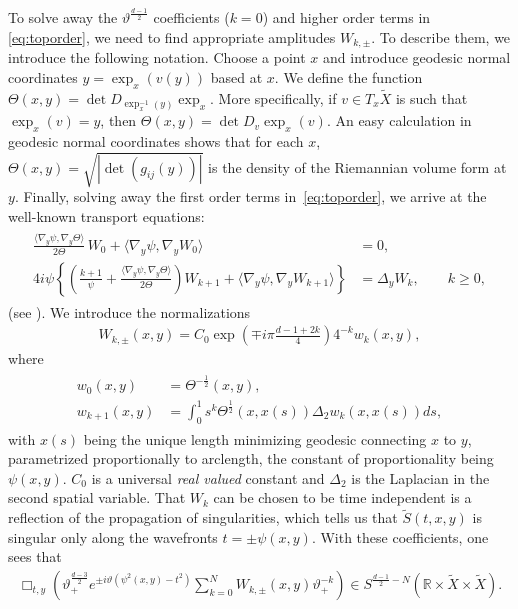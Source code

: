 \documentclass[11pt,letterpaper,oneside]{amsart}
\newcommand{\R}{\mathbb{R}}
\renewcommand{\theta}{\vartheta}
\theoremstyle{definition}
\theoremstyle{remark}
\newcommand{\wt}{\widetilde}
\theoremstyle{definition}
\theoremstyle{remark}
\begin{document}
To solve away the $\theta^{\frac{d-1}{2}}$ coefficients ($k = 0$) and higher order terms in \eqref{eq:toporder}, we need to find appropriate amplitudes $W_{k,\pm}$. To describe them, we introduce the following notation. Choose a point $x$ and introduce geodesic normal coordinates $y = \exp_x(v(y))$ based at $x$. We define the function $\Theta(x,y) = \det D_{\exp_x^{-1}(y)} \exp_x$. More specifically, if $v \in T_x \wt X$ is such that $\exp_x(v) = y$, then $\Theta(x,y) = \det D_v \exp_x(v)$. An easy calculation in geodesic normal coordinates shows that for each $x$, $\Theta(x,y) = \sqrt{|\det(g_{ij}(y))|}$ is the density of the Riemannian volume form at $y$. Finally, solving away the first order terms in~\eqref{eq:toporder}, we arrive at the well-known transport equations:
\begin{align}\label{eq:transport}
    \begin{split}
    \frac{\langle \nabla_y \psi, \nabla_y \Theta \rangle}{2\Theta}\, W_0 + \langle \nabla_y \psi, \nabla_y W_0 \rangle &= 0, \\
    4 i \psi \left\{ 
    \left( \frac{k+1}{\psi} + \frac{\langle \nabla_y \psi, \nabla_y \Theta \rangle}{2\Theta} \right) W_{k+1}
    + \langle \nabla_y \psi, \nabla_y W_{k+1} \rangle
    \right\} &= \Delta_y W_k, \qquad k \ge 0,
    \end{split}
\end{align}
(see \cite{BGM}). We introduce the normalizations
\begin{align}
\label{eq:normalized Wk}
    W_{k,\pm}(x,y) = C_0 \exp \left( \mp i \pi \frac{d-1 + 2k}{4}  \right) 4^{-k} w_k(x,y),
\end{align}
where
\begin{align}\label{eq:integratedw}
    \begin{split}
        w_0(x,y) &= \Theta^{-\frac{1}{2}}(x,y),\\
        w_{k+1}(x,y) &= \int_0^1 s^k \Theta^{\frac{1}{2}}(x,x(s)) \Delta_2 w_k(x,x(s)) ds,
    \end{split}
\end{align}
with $x(s)$ being the unique length minimizing geodesic connecting $x$ to $y$, parametrized proportionally to arclength, the constant of proportionality being $\psi(x,y)$. $C_0$ is a universal \textit{real valued} constant and $\Delta_2$ is the Laplacian in the second spatial variable. That $W_k$ can be chosen to be time independent is a reflection of the propagation of singularities, which tells us that $\wt S (t,x,y)$ is singular only along the wavefronts $t = \pm \psi(x,y)$.	
With these coefficients, one sees that
\begin{align*}
    \Box_{t,y} \left(\theta_+^{\frac{d-3}{2}} e^{\pm i \theta (\psi^2(x,y) - t^2)}\sum_{k = 0}^N W_{k, \pm}(x,y) \theta_+^{-k} \right) \in S^{\frac{d-1}{2} - N}(\R \times \wt X \times \wt X).
\end{align*}
\end{document}

